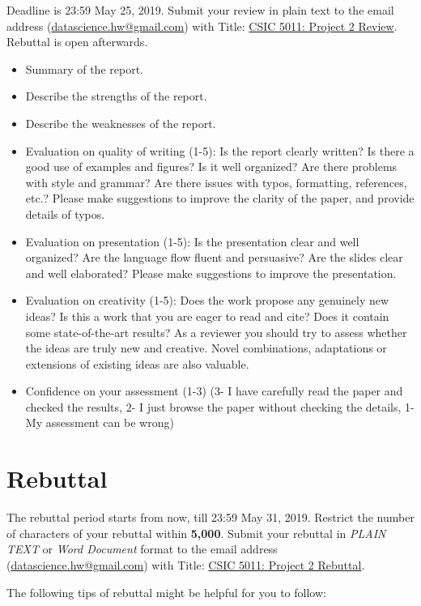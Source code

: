 \documentclass[11pt]{article}
\begin{document}
Deadline is 23:59 May 25, 2019. Submit your review in plain text to the email address (\href{mailto:datascience.hw@gmail.com}{datascience.hw@gmail.com}) with Title: \underline{CSIC 5011: Project 2 Review}. Rebuttal is open afterwards.

\begin{itemize}
\item Summary of the report.
\item Describe the strengths of the report. 
\item Describe the weaknesses of the report.
\item Evaluation on quality of writing (1-5): Is the report clearly written? Is there a good use of examples and figures? Is it well organized? Are there problems with style and grammar? Are there issues with typos, formatting, references, etc.? Please make suggestions to improve the clarity of the paper, and provide details of typos.
\item Evaluation on presentation (1-5): Is the presentation clear and well organized? Are the language flow fluent and persuasive? Are the slides clear and well elaborated? Please make suggestions to improve the presentation.
\item Evaluation on creativity (1-5): Does the work propose any genuinely new ideas? Is this a work that you are eager to read and cite? Does it contain some state-of-the-art results? As a reviewer you should try to assess whether the ideas are truly new and creative. Novel combinations, adaptations or extensions of existing ideas are also valuable.
\item Confidence on your assessment (1-3)
(3- I have carefully read the paper and checked the results, 2- I just browse the paper without checking the details, 1- My assessment can be wrong)
\end{itemize}

\newpage

\section*{Rebuttal}
The rebuttal period starts from now, till 23:59 May 31, 2019. Restrict the number of characters of your rebuttal within {\bf{5,000}}. Submit your rebuttal in \emph{PLAIN TEXT} or \emph{Word Document} format to the email address (\href{mailto:datascience.hw@gmail.com}{datascience.hw@gmail.com}) with Title: \underline{CSIC 5011: Project 2 Rebuttal}.

The following tips of rebuttal might be helpful for you to follow:
\end{document}
